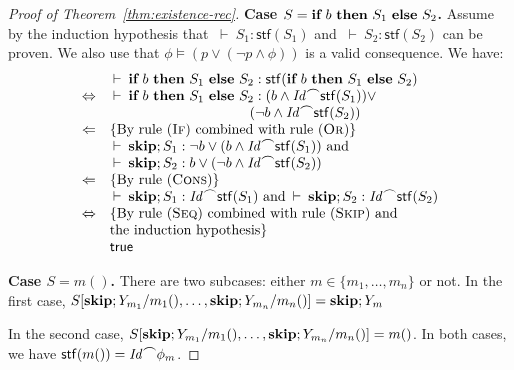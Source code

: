 \documentclass[10pt,a4paper]{amsart}
\theoremstyle{definition}
\newcommand{\chop}[0]{\raisebox{1ex}{$\frown$}}
\newcommand{\stfs}[1]{\mathsf{stf} (#1)}
\newcommand{\stfh}[2]{\mathsf{stf}(#1, #2)}
\newcommand{\Skip}{\mbox{\bf skip}}
\newcommand{\If}{\mbox{\bf if}}
\newcommand{\Then}{\mbox{\bf then}}
\newcommand{\Else}{\mbox{\bf else}}
\newcommand{\judge}[2]{#1 : #2}
\newcommand{\sequent}[2]{#1 \>\vdash\> #2}
\begin{document}
\begin{proof}[Proof of Theorem~\ref{thm:existence-rec}]
  \noindent\textbf{Case $S = \If\ b\ \Then\ S_1\ \Else\ S_2$.}
  Assume by the induction hypothesis that
  $\sequent{}{\judge{S_1}{\stfs{S_1}}}$ and
  $\sequent{}{\judge{S_2}{\stfs{S_2}}}$ can be proven.
  We also use that $\phi\models(p\lor(\lnot p\land\phi))$ is a valid
  consequence.
  We have: %
  \[
    \begin{array}{rl}
      & 
        \sequent{}{\judge{\If\ b\ \Then\ S_1\ \Else\ S_2}
        {\stfs{\If\ b\ \Then\ S_1\ \Else\ S_2}}} \\
      \Leftrightarrow & 
                        \sequent{}{\judge{\If\ b\ \Then\ S_1\ \Else\ S_2}
                        {(b \land \mathit{Id} \chop \stfs{S_1})
                        \lor
                        }} \\
      & \qquad\qquad\qquad\qquad\qquad(\lnot b \land \mathit{Id} \chop \stfs{S_2})\\
      \Leftarrow &
                   \mbox{\{By rule (\textsc{If}) combined with rule (\textsc{Or})\}} \\
      &
        \sequent{}{\judge{\Skip; S_1}
        {\lnot b \lor (b \land \mathit{Id} \chop \stfs{S_1})}} 
        ~\mbox{and}\\
      &
        \sequent{}{\judge{\Skip; S_2}
        {b \lor (\lnot b \land \mathit{Id} \chop \stfs{S_2})}} \\  
      \Leftarrow &
                   \mbox{\{By rule (\textsc{Cons})\}} \\
      &
        \sequent{}{\judge{\Skip; S_1}
        {\mathit{Id} \chop \stfs{S_1}}} 
        ~\mbox{and}
        \sequent{}{\judge{\Skip; S_2}
        {\mathit{Id} \chop \stfs{S_2}}} \\  
      \Leftrightarrow &
                        \mbox{\{By rule (\textsc{Seq}) combined with rule (\textsc{Skip})
                        and}\\
      & \mbox{the induction hypothesis\}} \\
      &
        \mathsf{true} 
    \end{array}
  \]
  
  \noindent\textbf{Case $S = m()$.}
  There are two subcases: either $m\in\{m_1,\ldots,m_n\}$ or not.
  In the first case,
  $S[\Skip;Y_{m_1}/m_1(),\ldots,\Skip;Y_{m_n}/m_n()]=\Skip;Y_m$

  In the second case,
  $S[\Skip;Y_{m_1}/m_1(),\ldots,\Skip;Y_{m_n}/m_n()]=m()$.
  In both cases, we have 
  $\stfs{m()} = \mathit{Id} \chop \phi_m$.
  

\end{proof}
\end{document}
